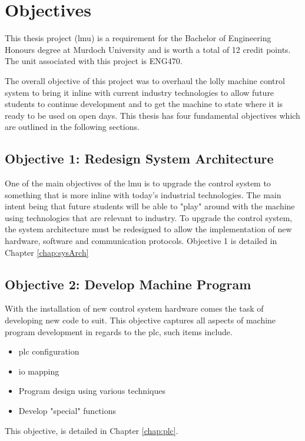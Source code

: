 \section{Objectives}
   This thesis project (\acrfull{lmu}) is a requirement for the Bachelor of Engineering Honours degree at Murdoch University and is worth a total of 12 credit points. The unit associated with this project is ENG470. 
   
   The overall objective of this project was to overhaul the lolly machine control system to bring it inline with current industry technologies to allow future students to continue development and to get the machine to state where it is ready to be used on open days. This thesis  has four fundamental objectives which are outlined in the following sections.
   
    
    \subsection{Objective 1: Redesign System Architecture}
        One of the main objectives of the \acrshort{lmu} is to upgrade the control system to something that is more inline with today's industrial technologies. The main intent being that future students will be able to  "play" around with the machine using technologies that are relevant to industry. To upgrade the control system, the system architecture must be redesigned to allow the implementation of new hardware, software and communication protocols. Objective 1 is detailed in Chapter \ref{chap:sysArch}
        
    \subsection{Objective 2: Develop Machine Program}
        With the installation of new control system hardware comes the task of developing new code to suit.
        This objective captures all aspects of machine program development in regards to the \acrshort{plc}, such items include.
        \begin{itemize}
            \item \acrshort{plc} configuration
            \item \acrshort{io} mapping
            \item Program design using various techniques
            \item Develop "special" functions
        \end{itemize}
        This objective, is detailed in Chapter \ref{chap:plc}.
        
